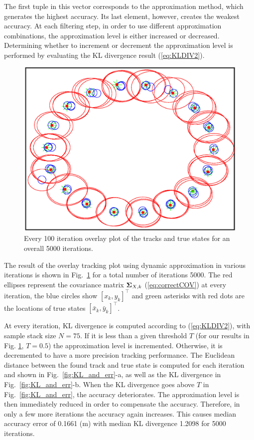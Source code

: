 The first tuple in this vector corresponds to the approximation method, which generates the highest accuracy. Its last element, however, creates the weakest accuracy.
At each filtering step, in order to use different approximation combinations, the approximation level is either increased or decreased. Determining whether to increment or decrement the approximation level is performed by evaluating the KL divergence result (\ref{eq:KLDIV2}).

\begin{figure}[tb]
  \centering
  \includegraphics[width=0.9\columnwidth]{img/Tracks_plot_cropped.eps}
  \caption{Every 100 iteration overlay plot of the tracks and true states for an overall 5000 iterations.}
  \label{fig:track_res}
\end{figure}

The result of the overlay tracking plot using dynamic approximation in various iterations is shown in Fig.~\ref{fig:track_res} for a total number of iterations 5000. 
The red ellipses represent the covariance matrix ${\bf \Sigma}_{X,k}$ (\ref{eq:correctCOV}) at every iteration, the blue circles show $[x_k, y_k]^\intercal$ and green asterisks with red dots are the locations of true states $[\bar{x}_k, \bar{y}_k]^\intercal$. 

At every iteration, KL divergence is computed according to (\ref{eq:KLDIV2}), with sample stack size $N = 75$.  If it is less than a given threshold $T$ (for our results in Fig. \ref{fig:track_res}, $T = 0.5$) the approximation level is incremented. Otherwise, it is decremented to have a more precision tracking performance. The Euclidean distance between the found track and true state is computed for each iteration and shown in Fig.~\ref{fig:KL_and_err}-a, as well as the KL divergence in Fig.~\ref{fig:KL_and_err}-b. When the KL divergence goes above $T$ in Fig.~\ref{fig:KL_and_err}, the accuracy deteriorates. The approximation level is then immediately reduced in order to compensate the accuracy. Therefore, in only a few more iterations the accuracy again increases. This causes median accuracy error of 0.1661 (m) with median KL divergence 1.2098 for 5000 iterations.

